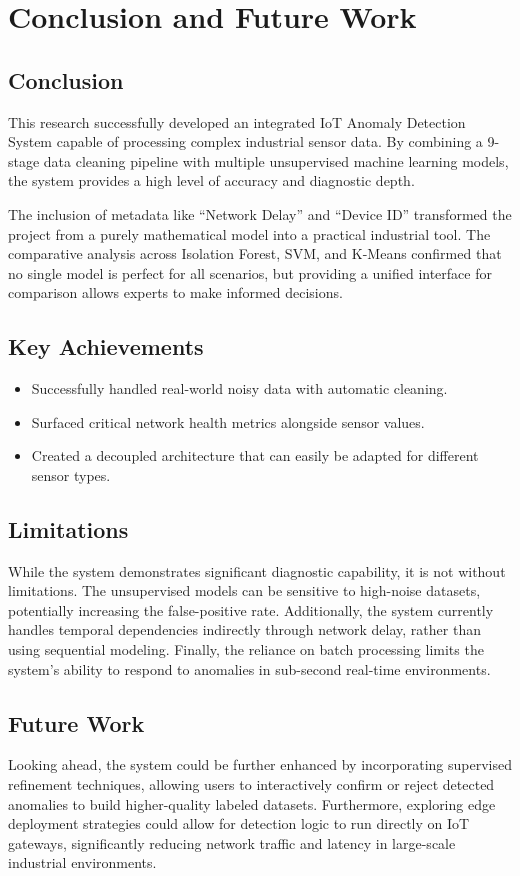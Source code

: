 \chapter{Conclusion and Future Work}

\section{Conclusion}
This research successfully developed an integrated IoT Anomaly Detection System capable of processing complex industrial sensor data. By combining a 9-stage data cleaning pipeline with multiple unsupervised machine learning models, the system provides a high level of accuracy and diagnostic depth. 

The inclusion of metadata like ``Network Delay'' and ``Device ID'' transformed the project from a purely mathematical model into a practical industrial tool. The comparative analysis across Isolation Forest, SVM, and K-Means confirmed that no single model is perfect for all scenarios, but providing a unified interface for comparison allows experts to make informed decisions.

\section{Key Achievements}
\begin{itemize}
    \item Successfully handled real-world noisy data with automatic cleaning.
    \item Surfaced critical network health metrics alongside sensor values.
    \item Created a decoupled architecture that can easily be adapted for different sensor types.
\end{itemize}

\section{Limitations}
While the system demonstrates significant diagnostic capability, it is not without limitations. The unsupervised models can be sensitive to high-noise datasets, potentially increasing the false-positive rate. Additionally, the system currently handles temporal dependencies indirectly through network delay, rather than using sequential modeling. Finally, the reliance on batch processing limits the system's ability to respond to anomalies in sub-second real-time environments.

\section{Future Work}
Looking ahead, the system could be further enhanced by incorporating supervised refinement techniques, allowing users to interactively confirm or reject detected anomalies to build higher-quality labeled datasets. Furthermore, exploring edge deployment strategies could allow for detection logic to run directly on IoT gateways, significantly reducing network traffic and latency in large-scale industrial environments.